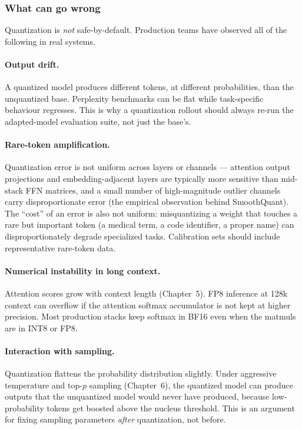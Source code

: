 \subsubsection{What can go wrong}

Quantization is \emph{not} safe-by-default. Production teams
have observed all of the following in real systems.

\paragraph{Output drift.}
A quantized model produces different tokens, at different
probabilities, than the unquantized base. Perplexity benchmarks can
be flat while task-specific behaviour regresses. This is why a
quantization rollout should always re-run the adapted-model
evaluation suite, not just the base's.

\paragraph{Rare-token amplification.}
Quantization error is not uniform across layers or channels ---
attention output projections and embedding-adjacent layers are
typically more sensitive than mid-stack FFN matrices, and a small
number of high-magnitude outlier channels carry disproportionate
error (the empirical observation behind SmoothQuant). The
``cost'' of an error is also not uniform: misquantizing a weight
that touches a rare but important token (a medical term, a code
identifier, a proper name) can
disproportionately degrade specialized tasks. Calibration sets
should include representative rare-token data.

\paragraph{Numerical instability in long context.}
Attention scores grow with context length (Chapter~5). FP8 inference
at 128k context can overflow if the attention softmax accumulator
is not kept at higher precision. Most production stacks keep
softmax in BF16 even when the matmuls are in INT8 or FP8.

\paragraph{Interaction with sampling.}
Quantization flattens the probability distribution slightly. Under
aggressive temperature and top-$p$ sampling (Chapter~6), the quantized
model can produce outputs that the unquantized model would never
have produced, because low-probability tokens get boosted above the
nucleus threshold. This is an argument for fixing sampling
parameters \emph{after} quantization, not before.

